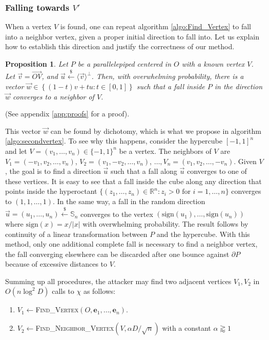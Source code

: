 \documentclass[11pt]{article}
\theoremstyle{plain}
\newtheorem{PROP}[THE]{Proposition}
\theoremstyle{definition}
\theoremstyle{remark}
\newcommand{\RR}{\mathbb{R}}      %
\newcommand{\ee}{\mathbf{e}}
\newcommand{\sign}{\mbox{sign}}
\newcommand{\bra}{\langle}
\newcommand{\ket}{\rangle}
\begin{document}
\subsubsection{Falling towards $V'$}
When a vertex $V$ is found, one can repeat algorithm \ref{algo:Find_Vertex} to fall into a neighbor vertex, given a proper initial direction to fall into. Let us explain how to establish this direction and justify the correctness of our method. 

\begin{PROP}
	\label{prop:neighbor}
	Let $P$ be a parallelepiped centered in $O$ with a known vertex $V$. Let $\vec v=\overrightarrow{OV}$, and $\vec u\xleftarrow{\$}\bra\vec v\ket^\perp$. Then, with overwhelming probability, there is a vector $\vec w\in \left\{(1-t)v+tu:t\in [0,1]\right\}$ such that a fall inside $P$ in the direction $\vec w$ converges to a neighbor of $V$. 
\end{PROP}
(See appendix \ref{app:proofs} for a proof).

This vector $\vec w$ can be found by dichotomy, which is what we propose in algorithm \ref{algo:secondvertex}. To see why this happens, consider the hypercube $[-1,1]^n$ and let $V=(v_1,\dots, v_n)\in \{-1,1\}^n$ be a vertex. The neighbors of $V$ are $V_1=(-v_1,v_2,\dots, v_n)$, $V_2=(v_1,-v_2,\dots, v_n)$, $\dots,V_n=(v_1,v_2,\dots,-v_n)$. Given $V$, the goal is to find a direction $\vec u$ such that a fall along $\vec u$ converges to one of these vertices. It is easy to see that a fall inside the cube along any direction that points inside the hyperoctant $\{(z_1,\dots,z_n)\in \RR^n:z_i>0\mbox{ for }i=1,\dots,n\}$ converges to $(1,1,\dots,1)$. In the same way, a fall in the random direction $\vec u=(u_1,\dots,u_n)\xleftarrow{\$} \mathbb{S}_n$ converges to the vertex $(\sign(u_1),\dots,\sign(u_n))$ where $\sign(x)=x/|x|$ with overwhelming probability. The result follows by continuity of a linear transformation between $P$ and the hypercube. With this method, only one additional complete fall is necessary to find a neighbor vertex, the fall converging elsewhere can be discarded after one bounce against $\partial P$ because of excessive distances to $V$.

Summing up all procedures, the attacker may find two adjacent vertices $V_1,V_2$ in $O(n\log^2 D)$ calls to $\chi$ as follows:
 \begin{enumerate}
 	\item $V_1\leftarrow$\textsc{Find\_Vertex}$(O,\ee_1,\dots,\ee_n)$.
 	\item $V_2\leftarrow$\textsc{Find\_Neighbor\_Vertex}$(V,\alpha D/\sqrt{n})$ with a constant $\alpha\gtrapprox 1$
 \end{enumerate}
 
\end{document}
